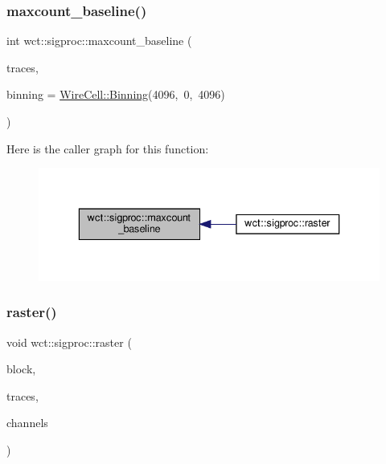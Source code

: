 \subsubsection{\texorpdfstring{maxcount\+\_\+baseline()}{maxcount\_baseline()}}
{\footnotesize\ttfamily int wct\+::sigproc\+::maxcount\+\_\+baseline (\begin{DoxyParamCaption}\item[{const \hyperlink{class_wire_cell_1_1_i_data_ae1a9f863380499bb43f39fabb6276660}{Wire\+Cell\+::\+I\+Trace\+::vector} \&}]{traces,  }\item[{const \hyperlink{class_wire_cell_1_1_binning}{Wire\+Cell\+::\+Binning} \&}]{binning = {\ttfamily \hyperlink{class_wire_cell_1_1_binning}{Wire\+Cell\+::\+Binning}(4096,~0,~4096)} }\end{DoxyParamCaption})}

Here is the caller graph for this function\+:
\nopagebreak
\begin{figure}[H]
\begin{center}
\leavevmode
\includegraphics[width=336pt]{namespacewct_1_1sigproc_a51e6bea6697a8859f4ed81e2254412ab_icgraph}
\end{center}
\end{figure}
\mbox{\label{namespacewct_1_1sigproc_ad081c59d5eae16e2375425a9e1a65679}} 
\subsubsection{\texorpdfstring{raster()}{raster()}}
{\footnotesize\ttfamily void wct\+::sigproc\+::raster (\begin{DoxyParamCaption}\item[{\hyperlink{namespace_wire_cell_1_1_array_ab565fef5e33632bb02f0ed4be803020c}{Wire\+Cell\+::\+Array\+::array\+\_\+xxf} \&}]{block,  }\item[{\hyperlink{class_wire_cell_1_1_i_data_ae1a9f863380499bb43f39fabb6276660}{Wire\+Cell\+::\+I\+Trace\+::vector}}]{traces,  }\item[{const std\+::vector$<$ int $>$ \&}]{channels }\end{DoxyParamCaption})}



